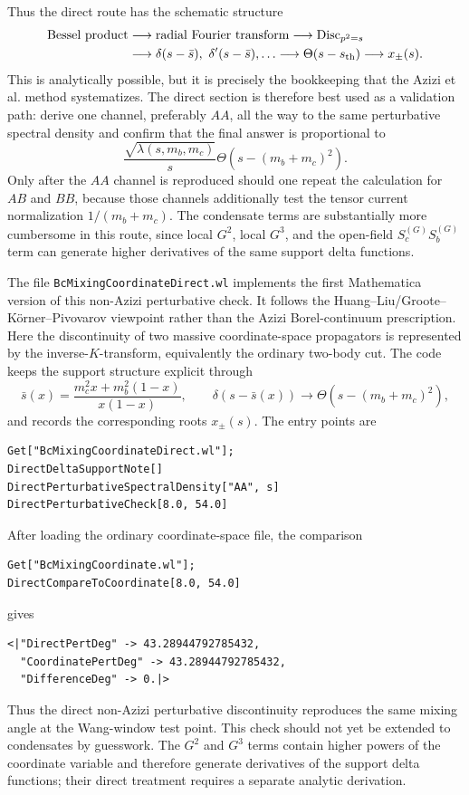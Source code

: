 \documentclass[11pt]{article}
\begin{document}
Thus the direct route has the schematic structure
\begin{align}
  \text{Bessel product}
  &\longrightarrow
  \text{radial Fourier transform}
  \longrightarrow
  \operatorname{Disc}_{p^2=s}
  \nonumber\\
  &\longrightarrow
  \delta(s-\bar s),\ \delta'(s-\bar s),\ldots
  \longrightarrow
  \Theta(s-s_{\rm th})
  \longrightarrow
  x_\pm(s).
\end{align}
This is analytically possible, but it is precisely the bookkeeping that the
Azizi et al. method systematizes.  The direct section is therefore best used
as a validation path: derive one channel, preferably \(AA\), all the way to
the same perturbative spectral density and confirm that the final answer is
proportional to
\begin{equation}
  \frac{\sqrt{\lambda(s,m_b,m_c)}}{s}
  \Theta\!\left(s-(m_b+m_c)^2\right).
\end{equation}
Only after the \(AA\) channel is reproduced should one repeat the calculation
for \(AB\) and \(BB\), because those channels additionally test the tensor
current normalization \(1/(m_b+m_c)\).  The condensate terms are substantially
more cumbersome in this route, since local \(G^2\), local \(G^3\), and the
open-field \(S_c^{(G)}S_b^{(G)}\) term can generate higher derivatives of the
same support delta functions.

The file \texttt{BcMixingCoordinateDirect.wl} implements the first
Mathematica version of this non-Azizi perturbative check.  It follows the
Huang--Liu/Groote--Körner--Pivovarov viewpoint rather than the Azizi
Borel-continuum prescription.  Here the discontinuity of two massive
coordinate-space propagators is represented by the inverse-\(K\)-transform,
equivalently the ordinary two-body cut.  The code keeps the support structure
explicit through
\begin{equation}
  \bar s(x)
  =
  \frac{m_c^2x+m_b^2(1-x)}{x(1-x)},
  \qquad
  \delta\!\left(s-\bar s(x)\right)
  \longrightarrow
  \Theta\!\left(s-(m_b+m_c)^2\right),
\end{equation}
and records the corresponding roots \(x_\pm(s)\).  The entry points are
\begin{verbatim}
Get["BcMixingCoordinateDirect.wl"];
DirectDeltaSupportNote[]
DirectPerturbativeSpectralDensity["AA", s]
DirectPerturbativeCheck[8.0, 54.0]
\end{verbatim}
After loading the ordinary coordinate-space file, the comparison
\begin{verbatim}
Get["BcMixingCoordinate.wl"];
DirectCompareToCoordinate[8.0, 54.0]
\end{verbatim}
gives
\begin{verbatim}
<|"DirectPertDeg" -> 43.28944792785432,
  "CoordinatePertDeg" -> 43.28944792785432,
  "DifferenceDeg" -> 0.|>
\end{verbatim}
Thus the direct non-Azizi perturbative discontinuity reproduces the same
mixing angle at the Wang-window test point.  This check should not yet be
extended to condensates by guesswork.  The \(G^2\) and \(G^3\) terms contain
higher powers of the coordinate variable and therefore generate derivatives
of the support delta functions; their direct treatment requires a separate
analytic derivation.
\end{document}
